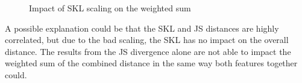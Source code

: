 \begin{figure}[htbp]
	\centering
	\caption{Impact of SKL scaling on the weighted sum}
	\label{fig:sklsc}
\end{figure}
\FloatBarrier

\noindent A possible explanation could be that the SKL and JS distances are highly correlated, but due to the bad scaling, the SKL has no impact on the overall distance. The results from the JS divergence alone are not able to impact the weighted sum of the combined distance in the same way both features together could. 

